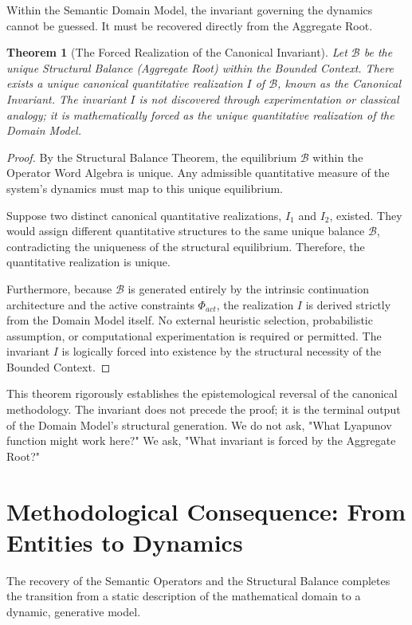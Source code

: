 \documentclass[12pt,openany]{extbook}
\theoremstyle{plain}
\newtheorem{theorem}{Theorem}[chapter]
\theoremstyle{definition}
\begin{document}
Within the Semantic Domain Model, the invariant governing the dynamics cannot be guessed. It must be recovered directly from the Aggregate Root.

\begin{theorem}[The Forced Realization of the Canonical Invariant]
Let $\mathcal{B}$ be the unique Structural Balance (Aggregate Root) within the Bounded Context. There exists a unique canonical quantitative realization $I$ of $\mathcal{B}$, known as the \emph{Canonical Invariant}. The invariant $I$ is not discovered through experimentation or classical analogy; it is mathematically forced as the unique quantitative realization of the Domain Model.
\end{theorem}

\begin{proof}
By the Structural Balance Theorem, the equilibrium $\mathcal{B}$ within the Operator Word Algebra is unique. Any admissible quantitative measure of the system's dynamics must map to this unique equilibrium. 

Suppose two distinct canonical quantitative realizations, $I_1$ and $I_2$, existed. They would assign different quantitative structures to the same unique balance $\mathcal{B}$, contradicting the uniqueness of the structural equilibrium. Therefore, the quantitative realization is unique.

Furthermore, because $\mathcal{B}$ is generated entirely by the intrinsic continuation architecture and the active constraints $\Phi_{act}$, the realization $I$ is derived strictly from the Domain Model itself. No external heuristic selection, probabilistic assumption, or computational experimentation is required or permitted. The invariant $I$ is logically forced into existence by the structural necessity of the Bounded Context.
\end{proof}

This theorem rigorously establishes the epistemological reversal of the canonical methodology. The invariant does not precede the proof; it is the terminal output of the Domain Model's structural generation. We do not ask, "What Lyapunov function might work here?" We ask, "What invariant is forced by the Aggregate Root?"

\section{Methodological Consequence: From Entities to Dynamics}

The recovery of the Semantic Operators and the Structural Balance completes the transition from a static description of the mathematical domain to a dynamic, generative model. 
\end{document}
